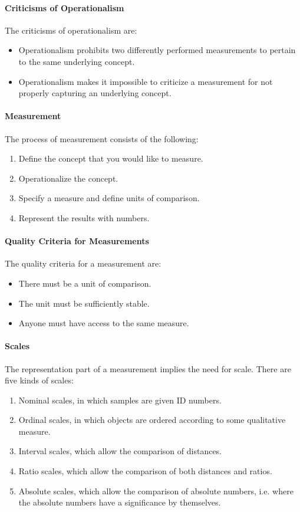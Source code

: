 \paragraph{Criticisms of Operationalism}
The criticisms of operationalism are:
\begin{itemize}
	\item Operationalism prohibits two differently performed measurements to pertain to the same underlying concept.
	\item Operationalism makes it impossible to criticize a measurement for not properly capturing an underlying concept.
\end{itemize}

\paragraph{Measurement}
The process of measurement consists of the following:
\begin{enumerate}
	\item Define the concept that you would like to measure.
	\item Operationalize the concept.
	\item Specify a measure and define units of comparison.
	\item Represent the results with numbers.
\end{enumerate}

\paragraph{Quality Criteria for Measurements}
The quality criteria for a measurement are:
\begin{itemize}
	\item There must be a unit of comparison.
	\item The unit must be sufficiently stable.
	\item Anyone must have access to the same measure.
\end{itemize}

\paragraph{Scales}
The representation part of a measurement implies the need for scale. There are five kinds of scales:
\begin{enumerate}
	\item Nominal scales, in which samples are given ID numbers.
	\item Ordinal scales, in which objects are ordered according to some qualitative measure.
	\item Interval scales, which allow the comparison of distances.
	\item Ratio scales, which allow the comparison of both distances and ratios.
	\item Absolute scales, which allow the comparison of absolute numbers, i.e. where the absolute numbers have a significance by themselves.
\end{enumerate}

